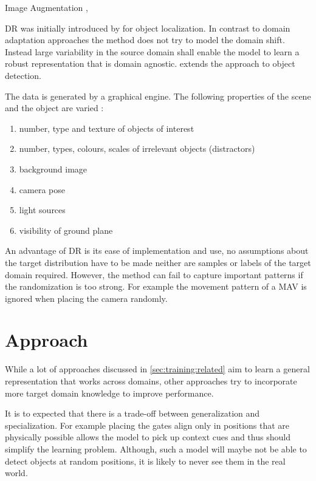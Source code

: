 \cite{Vass}

Image Augmentation
\cite{Bai2017},

\ac{DR} was initially introduced by \cite{Tobin2017} for object localization. In contrast to domain adaptation approaches the method does not try to model the domain shift. Instead large variability in the source domain shall enable the model to learn a robust representation that is domain agnostic. \cite{Tremblay2018a} extends the approach to object detection.

The data is generated by a graphical engine. The following properties of the scene and the object are varied \cite{Tremblay2018a}:

\begin{enumerate}
	\item number, type and texture of objects of interest
	\item number, types, colours, scales of irrelevant objects (distractors)
	\item background image
	\item camera pose
	\item light sources
	\item visibility of ground plane
\end{enumerate}

An advantage of \ac{DR} is its ease of implementation and use, no assumptions about the target distribution have to be made neither are samples or labels of the target domain required. However, the method can fail to capture important patterns if the randomization is too strong. For example the movement pattern of a \ac{MAV} is ignored when placing the camera randomly.
 
\section{Approach}
\label{sec:training:hypothesis}

While a lot of approaches discussed in \autoref{sec:training:related} aim to learn a general representation that works across domains, other approaches try to incorporate more target domain knowledge to improve performance. 

It is to expected that there is a trade-off between generalization and specialization. For example placing the gates align only in positions that are physically possible allows the model to pick up context cues and thus should simplify the learning problem. Although, such a model will maybe not be able to detect objects at random positions, it is likely to never see them in the real world. 


